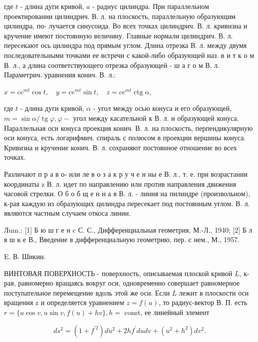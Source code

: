 \documentclass[10pt]{article}
\begin{document}
где $t$ - длина дуги кривой, $a$ - радиус цилиндра. При параллельном проектировании цилиндрич. В. л. на плоскость, параллельную образующим цилиндра, по- лучается синусоида. Во всех точках цилиндрич. В. л. кривизна и кручение имеют постоянную величину. Главные нормали цилиндрич. В. л. пересекают ось цилиндра под прямым углом. Длина отрезка В. л. между двумя последовательными точками ее встречи с какой-либо образующей наз. в и т к о м В. л., а длина соответствующего отрезка образующей - ш а г о м В. л. Параметрич. уравнения конич. В. л.:



$x=c e^{m t} \cos t, \quad y=c e^{m t} \sin t, \quad z=c e^{m t} \operatorname{ctg} \alpha$,



где $t$ - длина дуги кривой, $\alpha$ - угол между осью конуса и его образующей, $m=\sin \alpha / \operatorname{tg} \varphi, \varphi-$ угол между касательной к В. л. и образующей конуса. Параллельная оси конуса проекция конич. В. л. на плоскость, перпендикулярную оси конуса, есть логарифмич. спираль с полюсом в проекции вершины конуса. Кривизна и кручение конич. В. л. сохраняют постоянное отношение во всех точках.



Различают п р а в о- или ле в о з а к р у ч е н ны е В. л., т. е. при возрастании координаты z В. л. идет по направлению или против направления движения часовой стрелки. О б о б щ е н н а я В. л. - линия на пилиндре (произвольном), к-рая каждую из образующих цилиндра пересекает под постоянным углом. В. л. являются частным случаем откоса линии.



Лum.: [1] Б ю ш г е н c С. С., Дифференциальная геометрия, М.-Л., 1940; [2] Б л я ш к е В., Введение в дифференциальную геометрию, пер. с нем., М., 1957.



E. В. Шикин.



ВИНТОВАЯ ПОВЕРХНОСТЬ - поверхность, описываемая плоской кривой $L$, к-рая, равномерно вращаясь вокруг оси, одновременно совершает равномерное поступательное перемещение вдоль этой же оси. Если $L$ лежит в плоскости оси вращения z и определяется уравнением $z=f(u)$, то радиус-вектор В. П. есть $r=\{u \cos v, u \sin v, f(u)+h v\}, h=$ const, ее линейный элемент



\[

d s^{2}=\left(1+f^{\prime 2}\right) d u^{2}+2 h f^{\prime} d u d v+\left(u^{2}+h^{2}\right) d v^{2} .

\]
\end{document}
